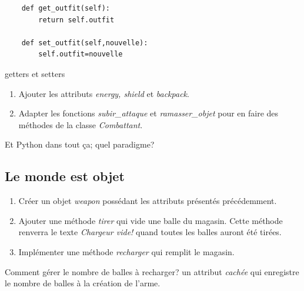 \documentclass[a4paper,11pt]{article}
\begin{document}
\begin{Form}
\begin{lstlisting}
	def get_outfit(self):
		return self.outfit
	
	def set_outfit(self,nouvelle):
		self.outfit=nouvelle
\end{lstlisting}
\begin{commentprof}
getters et setters
\end{commentprof}
\begin{activite}
\begin{enumerate}
\item Ajouter les attributs \emph{energy, shield} et \emph{backpack}.
\item Adapter les fonctions \emph{subir\_attaque} et \emph{ramasser\_objet} pour en faire des méthodes de la classe \emph{Combattant}.
\end{enumerate}
\end{activite}
\begin{commentprof}
Et Python dans tout ça; quel paradigme?
\end{commentprof}
\subsection{Le monde est objet}
\begin{activite}
\begin{enumerate}
\item Créer un objet \emph{weapon} possédant les attributs présentés précédemment.
\item Ajouter une méthode \emph{tirer} qui vide une balle du magasin. Cette méthode renverra le texte \emph{Chargeur vide!} quand toutes les balles auront été tirées.
\item Implémenter une méthode \emph{recharger} qui remplit le magasin.
\end{enumerate}
\end{activite}
\begin{commentprof}
Comment gérer le nombre de balles à recharger? un attribut \emph{cachée} qui enregistre le nombre de balles à la création de l'arme.
\end{commentprof}
\end{Form}
\end{document}
